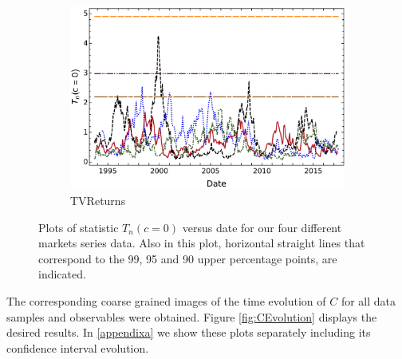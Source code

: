 \documentclass{elsarticle}
\begin{document}
\begin{figure}[htb!]
\begin{subfigure}[b]{0.47\textwidth}
            \includegraphics[width=\textwidth]{figures/zerosymmetry/simetria_cero_tiempo_trendvel.pdf}
            \caption[]{{\small TVReturns}}
            \label{fig:ZeroSymmTVReturns}
        \end{subfigure}
        \caption[Plots of statistic $T_{n}(c = 0)$ versus date for our four different markets series data]
        {\small Plots of statistic $T_{n}(c = 0)$ versus date for our four different markets series data. Also in this plot, horizontal straight lines that correspond to the 99, 95 and 90 upper percentage points, are indicated.} 
        \label{fig:ZeroSymm}
\end{figure}


The corresponding coarse grained images of the time evolution of $C$ for all  data samples and observables were obtained. Figure \ref{fig:CEvolution} displays the desired results. In \ref{appendixa} we show these plots separately including its confidence interval evolution. 
\end{document}
